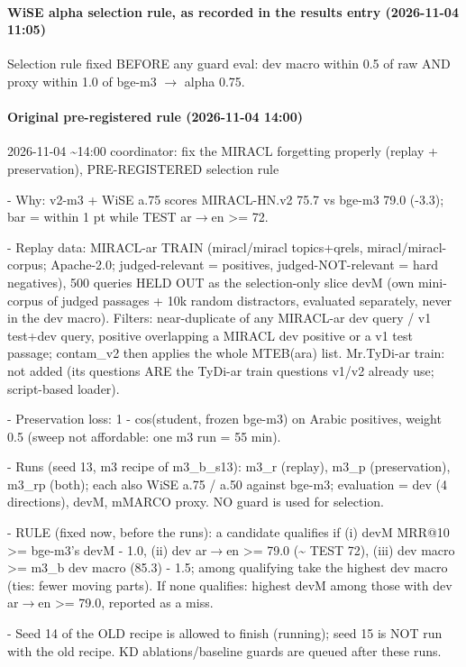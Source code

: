 \paragraph{WiSE alpha selection rule, as recorded in the results entry (2026-11-04 11:05)}
{\footnotesize\raggedright
Selection rule fixed BEFORE any guard eval: dev macro within 0.5 of raw AND proxy within 1.0 of bge-m3 $\to$ alpha 0.75.\par}

\paragraph{Original pre-registered rule (2026-11-04 14:00)}
{\footnotesize\raggedright
2026-11-04 \textasciitilde{}14:00 coordinator: fix the MIRACL forgetting properly (replay + preservation), PRE-REGISTERED selection rule

- Why: v2-m3 + WiSE a.75 scores MIRACL-HN.v2 75.7 vs bge-m3 79.0 (-3.3); bar = within 1 pt while TEST ar$\to$en >= 72.

- Replay data: MIRACL-ar TRAIN (miracl/miracl topics+qrels, miracl/miracl-corpus; Apache-2.0; judged-relevant = positives, judged-NOT-relevant = hard negatives), 500 queries HELD OUT as the selection-only slice devM (own mini-corpus of judged passages + 10k random distractors, evaluated separately, never in the dev macro). Filters: near-duplicate of any MIRACL-ar dev query / v1 test+dev query, positive overlapping a MIRACL dev positive or a v1 test passage; contam\_v2 then applies the whole MTEB(ara) list. Mr.TyDi-ar train: not added (its questions ARE the TyDi-ar train questions v1/v2 already use; script-based loader).

- Preservation loss: 1 - cos(student, frozen bge-m3) on Arabic positives, weight 0.5 (sweep not affordable: one m3 run = 55 min).

- Runs (seed 13, m3 recipe of m3\_b\_s13): m3\_r (replay), m3\_p (preservation), m3\_rp (both); each also WiSE a.75 / a.50 against bge-m3; evaluation = dev (4 directions), devM, mMARCO proxy. NO guard is used for selection.

- RULE (fixed now, before the runs): a candidate qualifies if (i) devM MRR@10 >= bge-m3's devM - 1.0, (ii) dev ar$\to$en >= 79.0 (\textasciitilde{} TEST 72), (iii) dev macro >= m3\_b dev macro (85.3) - 1.5; among qualifying take the highest dev macro (ties: fewer moving parts). If none qualifies: highest devM among those with dev ar$\to$en >= 79.0, reported as a miss.

- Seed 14 of the OLD recipe is allowed to finish (running); seed 15 is NOT run with the old recipe. KD ablations/baseline guards are queued after these runs.\par}

